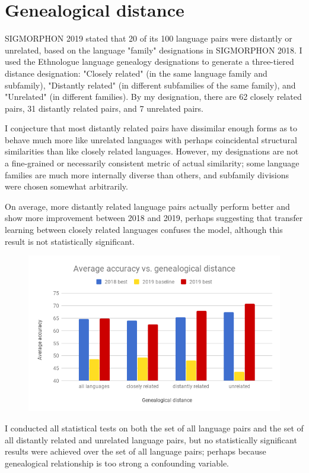 \section{Genealogical distance}

SIGMORPHON 2019 stated that 20 of its 100 language pairs were distantly or unrelated, based on the language "family" designations in SIGMORPHON 2018. I used the Ethnologue language genealogy designations to generate a three-tiered distance designation: "Closely related" (in the same language family and subfamily), "Distantly related" (in different subfamilies of the same family), and "Unrelated" (in different families). By my designation, there are 62 closely related pairs, 31 distantly related pairs, and 7 unrelated pairs.

I conjecture that most distantly related pairs have dissimilar enough forms as to behave much more like unrelated languages with perhaps coincidental structural similarities than like closely related languages. However, my designations are not a fine-grained or necessarily consistent metric of actual similarity; some language families are much more internally diverse than others, and subfamily divisions were chosen somewhat arbitrarily. 

On average, more distantly related language pairs actually perform better and show more improvement between 2018 and 2019, perhaps suggesting that transfer learning between closely related languages confuses the model, although this result is not statistically significant.

\begin{figure}[ht]
\includegraphics[width=12cm]{images/Average_accuracy_vs_genealogical_distance.png}
\centering
\end{figure}

I conducted all statistical tests on both the set of all language pairs and the set of all distantly related and unrelated language pairs, but no statistically significant results were achieved over the set of all language pairs; perhaps because genealogical relationship is too strong a confounding variable.


